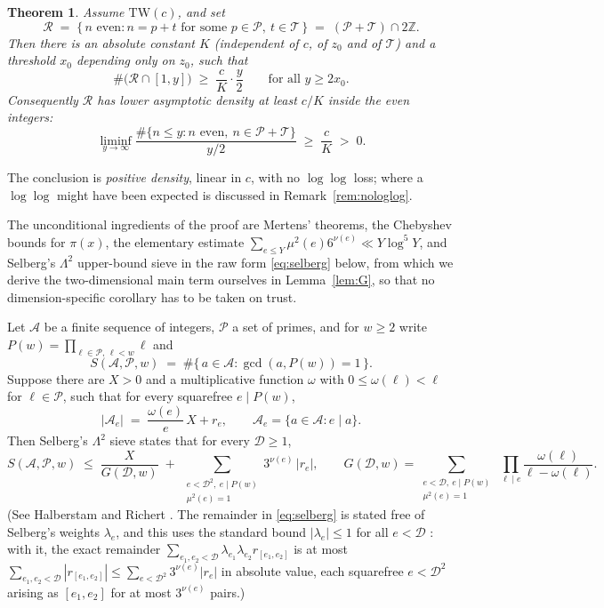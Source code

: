 \documentclass[10pt]{article}
\newtheorem{theorem}{Theorem}
\theoremstyle{definition}
\theoremstyle{remark}
\newcommand{\T}{\mathcal{T}}
\newcommand{\PP}{\mathcal{P}}
\begin{document}
\begin{theorem}\label{thm:romanov}
Assume $\mathrm{TW}(c)$, and set
\[
  \mathcal{R} \;=\; \{\, n \text{ even} : n = p + t
    \text{ for some } p \in \PP,\ t \in \T \,\}
  \;=\; (\PP + \T) \cap 2\mathbb{Z}.
\]
Then there is an absolute constant $K$ (independent of $c$, of $z_0$ and of
$\T$) and a threshold $x_0$ depending only on $z_0$, such that
\[
  \#\bigl(\mathcal{R} \cap [1, y]\bigr) \;\ge\; \frac{c}{K}\cdot\frac{y}{2}
  \qquad\text{for all } y \ge 2x_0 .
\]
Consequently $\mathcal{R}$ has lower asymptotic density at least $c/K$ inside
the even integers:
\[
  \liminf_{y \to \infty}
  \frac{\#\{n \le y : n \text{ even},\ n \in \PP + \T\}}{y/2}
  \;\ge\; \frac{c}{K} \;>\; 0 .
\]
\end{theorem}

The conclusion is \emph{positive density}, linear in $c$, with no $\log\log$
loss; where a $\log\log$ might have been expected is discussed in
Remark~\ref{rem:nologlog}.

The unconditional ingredients of the proof are Mertens' theorems, the
Chebyshev bounds for $\pi(x)$, the elementary estimate
$\sum_{e \le Y}\mu^2(e)6^{\nu(e)} \ll Y \log^5 Y$, and Selberg's $\Lambda^2$
upper-bound sieve in the raw form \eqref{eq:selberg} below, from which we
derive the two-dimensional main term ourselves in Lemma~\ref{lem:G}, so that
no dimension-specific corollary has to be taken on trust.

Let $\mathcal{A}$ be a finite sequence of integers, $\mathcal{P}$ a set of
primes, and for $w \ge 2$ write $P(w) = \prod_{\ell \in \mathcal{P},\, \ell < w}\ell$
and
\[
  S(\mathcal{A}, \mathcal{P}, w)
    \;=\; \#\{\, a \in \mathcal{A} : \gcd(a, P(w)) = 1 \,\}.
\]
Suppose there are $X > 0$ and a multiplicative function $\omega$ with
$0 \le \omega(\ell) < \ell$ for $\ell \in \mathcal{P}$, such that for every
squarefree $e \mid P(w)$,
\[
  |\mathcal{A}_e| \;=\; \frac{\omega(e)}{e}\,X + r_e,
  \qquad \mathcal{A}_e = \{a \in \mathcal{A} : e \mid a\}.
\]
Then Selberg's $\Lambda^2$ sieve states that for every $\mathcal{D} \ge 1$,
\begin{equation}\label{eq:selberg}
  S(\mathcal{A}, \mathcal{P}, w)
  \;\le\; \frac{X}{G(\mathcal{D}, w)}
    \;+\; \sum_{\substack{e < \mathcal{D}^{2},\ e \mid P(w) \\ \mu^{2}(e) = 1}}
      3^{\nu(e)}\,|r_e| ,
  \qquad
  G(\mathcal{D}, w) = \sum_{\substack{e < \mathcal{D},\ e \mid P(w) \\ \mu^{2}(e) = 1}}
    \ \prod_{\ell \mid e} \frac{\omega(\ell)}{\ell - \omega(\ell)} .
\end{equation}
(See Halberstam and Richert \cite[Ch.~3]{HR}. The remainder in
\eqref{eq:selberg} is stated free of Selberg's weights $\lambda_e$, and this
uses the standard bound $|\lambda_e| \le 1$ for all $e < \mathcal{D}$
\cite[Ch.~3]{HR}: with it, the exact remainder
$\sum_{e_1, e_2 < \mathcal{D}}\lambda_{e_1}\lambda_{e_2} r_{[e_1,e_2]}$ is at
most $\sum_{e_1, e_2 < \mathcal{D}} |r_{[e_1,e_2]}|
\le \sum_{e < \mathcal{D}^2} 3^{\nu(e)}|r_e|$ in absolute value, each
squarefree $e < \mathcal{D}^2$ arising as $[e_1,e_2]$ for at most $3^{\nu(e)}$
pairs.)
\end{document}
